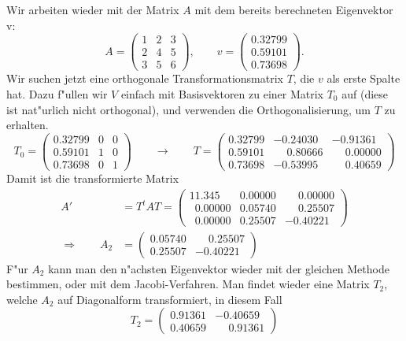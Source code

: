 \begin{beispiel}
Wir arbeiten wieder mit der Matrix $A$ mit dem bereits berechneten
Eigenvektor v:
\[
A=\begin{pmatrix}
1&2&3\\
2&4&5\\
3&5&6
\end{pmatrix}
,\qquad
v=\begin{pmatrix}
   0.32799\\
   0.59101\\
   0.73698
\end{pmatrix}.
\]
Wir suchen jetzt eine orthogonale Transformationsmatrix $T$, die $v$
als erste Spalte hat. Dazu f"ullen wir $V$ einfach mit Basisvektoren
zu einer Matrix $T_0$ auf (diese ist nat"urlich nicht orthogonal),
und verwenden die Orthogonalisierung, um $T$ zu erhalten.
\[
T_0=\begin{pmatrix}
   0.32799&0&0\\
   0.59101&1&0\\
   0.73698&0&1
\end{pmatrix}
\qquad\rightarrow\qquad
T=
\begin{pmatrix}
   0.32799 &-0.24030& -0.91361\\
   0.59101 &\phantom{-} 0.80666&  \phantom{-}0.00000\\
   0.73698 &-0.53995&  \phantom{-}0.40659
\end{pmatrix}
\]
Damit ist die transformierte Matrix 
\begin{align*}
A'&=T^tAT=\begin{pmatrix}
   11.345              &0.00000 & \phantom{-}0.00000\\
   \phantom{0}0.00000  &0.05740 & \phantom{-}0.25507\\
   \phantom{0}0.00000  &0.25507 &-0.40221
\end{pmatrix}
\\
\Rightarrow\qquad
A_2&=
\begin{pmatrix}
   0.05740 & \phantom{-}0.25507\\
   0.25507 &-0.40221
\end{pmatrix}
\end{align*}
F"ur $A_2$ kann man den n"achsten Eigenvektor wieder mit der
gleichen Methode bestimmen, oder mit dem Jacobi-Verfahren. Man
findet wieder eine Matrix $T_2$, welche $A_2$ auf Diagonalform
transformiert, in diesem Fall
\[
T_2=\begin{pmatrix}
   0.91361&          -0.40659\\
   0.40659&\phantom{-}0.91361

\end{pmatrix}\]
\end{beispiel}
